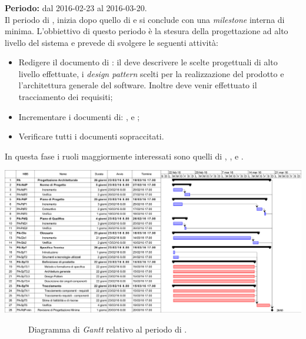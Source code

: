 \subsubsection{\PA}
\textbf{Periodo:} dal 2016-02-23 al 2016-03-20. \\
Il periodo di \PA, inizia dopo quello di \AD e si conclude con una \textit{milestone} interna di \RdP minima. L'obbiettivo di questo periodo è la stesura della progettazione ad alto livello del sistema e prevede di svolgere le seguenti attività:
\begin{itemize}
	\item Redigere il documento di \textit{\ST}: il \textit{\Prog} deve descrivere le scelte progettuali di alto livello effettuate, i \textit{design pattern} scelti per la realizzazione del prodotto e l'architettura generale del software. Inoltre deve venir effettuato il tracciamento dei requisiti;  
	\item Incrementare i documenti di: \textit{\NdP},\textit{\PdP} e \textit{\PdQ};
	\item Verificare tutti i documenti sopraccitati.
\end{itemize}
In questa fase i ruoli maggiormente interessati sono quelli di \textit{\Amm}, \textit{\Res}, \textit{\Prog} e \textit{\Ver}. 
\begin{center}
	\includegraphics[keepaspectratio = true, width=16cm]{immagini/PdP_ProgettazioneArchitetturaleGantt.png}
\end{center}
\begin{figure}[h]
	\caption{Diagramma di \textit{Gantt} relativo al periodo di \PA.}\label{etichetta}
\end{figure}

